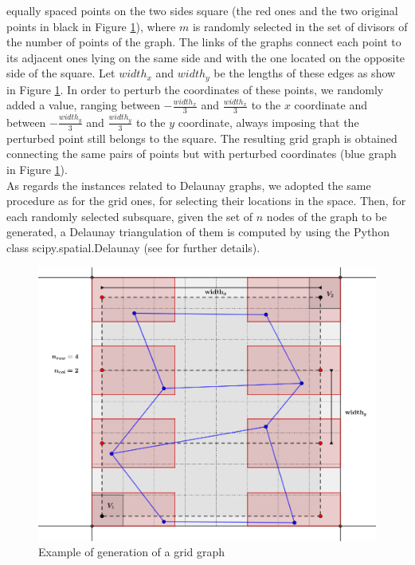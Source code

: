 equally spaced points on the two sides square (the red ones and the two original points in black in Figure \ref{fig:fig1}), where $m$ is randomly selected in the set of divisors of the number of points of the graph. The links of the graphs connect each point to its adjacent ones lying on the same side and with the one located on the opposite side of the square.  Let $width_x$ and $width_y$ be the lengths  of these edges as show in Figure \ref{fig:fig1}. In order to perturb the coordinates of these points, we randomly added a value, ranging between $-\frac{width_x}{3}$ and $\frac{width_x}{3}$ to the $x$ coordinate and between $-\frac{width_y}{3}$ and $\frac{width_y}{3}$ to the $y$ coordinate, always imposing that the perturbed point still belongs to the square. The resulting grid graph is obtained connecting the same pairs of points but with perturbed coordinates (blue graph in Figure \ref{fig:fig1}). \\
As regards the instances related to Delaunay graphs, we adopted the same procedure as for the grid ones, for selecting their locations in the space. Then, for each randomly selected subsquare, given the set of $n$ nodes of the graph to be generated, a Delaunay triangulation of them is computed by using the Python class scipy.spatial.Delaunay (see \cite{art:Virtanen2020} for further details).





\begin{figure}[h!]
\begin{center}
 \includegraphics[width=0.6\linewidth]{Grid_generation_2.png}
\end{center}
\caption{Example of generation of a grid graph}
\label{fig:fig1}
\end{figure}
 
